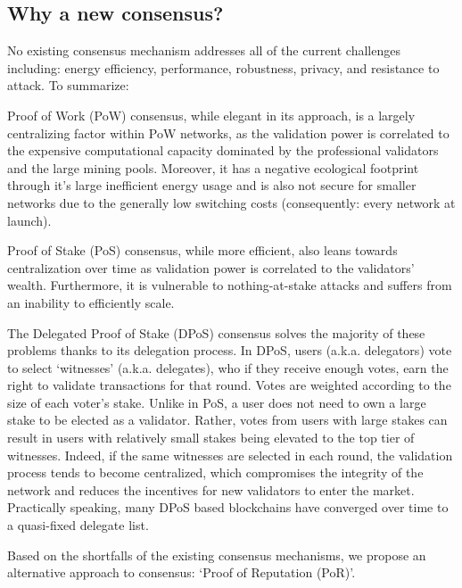 \subsection{Why a new consensus?}
\label{sec:kiblockchainwhy}
No existing consensus mechanism addresses all of the current challenges including: energy efficiency, performance, robustness, privacy, and resistance to attack. To summarize:

Proof of Work (PoW) consensus, while elegant in its approach, is a largely centralizing factor within PoW networks, as the validation power is correlated to the expensive computational capacity dominated by the professional validators and the large mining pools. Moreover, it has a negative ecological footprint through it's large inefficient energy usage and is also not secure for smaller networks due to the generally low switching costs (consequently: every network at launch).

Proof of Stake (PoS) consensus, while more efficient, also leans towards centralization over time  as validation power is correlated to the validators' wealth. Furthermore, it is vulnerable to nothing-at-stake attacks and suffers from an inability to efficiently scale.

The Delegated Proof of Stake (DPoS) consensus solves the majority of these problems thanks to its delegation process. In DPoS, users (a.k.a. delegators) vote to select ‘witnesses’ (a.k.a. delegates), who if they receive enough votes, earn the right to validate transactions for that round. Votes are weighted according to the size of each voter's stake. Unlike in PoS, a user does not need to own a large stake to be elected as a validator. Rather, votes from users with large stakes can result in users with relatively small stakes being elevated to the top tier of witnesses. Indeed, if the same witnesses are selected in each round, the validation process tends to become centralized, which compromises the integrity of the network and reduces the incentives for new validators to enter the market. Practically speaking, many DPoS based blockchains have converged over time to a quasi-fixed delegate list.

Based on the shortfalls of the existing consensus mechanisms, we propose an alternative approach to consensus: ‘Proof of Reputation (PoR)'.

